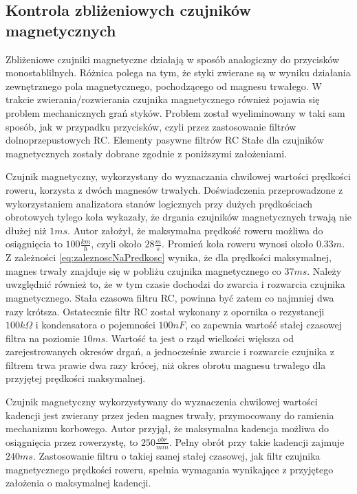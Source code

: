 \subsection{Kontrola zbliżeniowych czujników magnetycznych}
Zbliżeniowe czujniki magnetyczne działają w sposób analogiczny do przycisków monostablilnych. Różnica polega na tym, że styki zwierane są w wyniku działania zewnętrznego pola magnetycznego, pochodzącego od magnesu trwałego. W trakcie zwierania/rozwierania czujnika magnetycznego również pojawia się problem mechanicznych grań styków. Problem został wyeliminowany w taki sam sposób, jak w przypadku przycisków, czyli przez zastosowanie filtrów dolnoprzepustowych RC. Elementy pasywne filtrów RC Stałe dla czujników magnetycznych zostały dobrane zgodnie z poniższymi założeniami.

Czujnik magnetyczny, wykorzystany do wyznaczania chwilowej wartości prędkości roweru, korzysta z dwóch magnesów trwałych. Doświadczenia przeprowadzone z wykorzystaniem analizatora stanów logicznych przy dużych prędkościach obrotowych tylego koła wykazały, że drgania czujników magnetycznych trwają nie dłużej niż $1ms$.  Autor założył, że maksymalna prędkość roweru możliwa do osiągnięcia to $100\frac{km}{h}$, czyli około $28\frac{m}{s}$. Promień koła roweru wynosi około $0.33m$. Z zależności \ref{eq:zaleznoscNaPredkosc} wynika, że dla prędkości maksymalnej, magnes trwały znajduje się w pobliżu czujnika magnetycznego co $37ms$. Należy uwzględnić również to, że w tym czasie dochodzi do zwarcia i rozwarcia czujnika magnetycznego. Stała czasowa filtru RC, powinna być zatem co najmniej dwa razy krótsza. Ostatecznie filtr RC został wykonany z opornika o rezystancji $100k\Omega$ i kondensatora o pojemności $100nF$, co zapewnia wartość stałej czasowej filtra na poziomie $10ms$. Wartość ta jest o rząd wielkości większa od zarejestrowanych okresów drgań, a jednocześnie zwarcie i rozwarcie czujnika z filtrem trwa prawie dwa razy krócej, niż okres obrotu magnesu trwałego dla przyjętej prędkości maksymalnej.

Czujnik magnetyczny wykorzystywany do wyznaczenia chwilowej wartości kadencji jest zwierany przez jeden magnes trwały, przymocowany do ramienia mechanizmu korbowego. Autor przyjął, że maksymalna kadencja możliwa do osiągnięcia przez rowerzystę, to $250\frac{obr}{min}$. Pełny obrót przy takie kadencji zajmuje $240ms$. Zastosowanie filtru o takiej samej stałej czasowej, jak filtr czujnika magnetycznego prędkości roweru, spełnia wymagania wynikające z przyjętego założenia o maksymalnej kadencji. 
